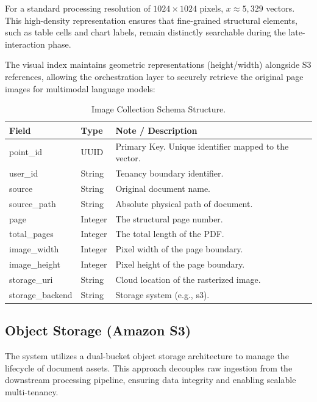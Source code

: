 For a standard processing resolution of $1024 \times 1024$ pixels, $x \approx 5,329$ vectors. This high-density representation ensures that fine-grained structural elements, such as table cells and chart labels, remain distinctly searchable during the late-interaction phase.

The visual index maintains geometric representations (height/width) alongside S3 references, allowing the orchestration layer to securely retrieve the original page images for multimodal language models:
\begin{table}[H]
    \centering
    \caption{Image Collection Schema Structure.}
    \label{tab:qdrant_image_schema}
    \begin{tabular}{llp{8cm}}
        \toprule
        \textbf{Field} & \textbf{Type} & \textbf{Note / Description} \\
        \midrule
        point\_id & UUID & Primary Key. Unique identifier mapped to the vector. \\
        \midrule
        user\_id & String & Tenancy boundary identifier. \\
        source & String & Original document name. \\
        source\_path & String & Absolute physical path of document. \\
        page & Integer & The structural page number. \\
        total\_pages & Integer & The total length of the PDF. \\
        image\_width & Integer & Pixel width of the page boundary. \\
        image\_height & Integer & Pixel height of the page boundary. \\
        storage\_uri & String & Cloud location of the rasterized image. \\
        storage\_backend & String & Storage system (e.g., s3). \\
        \bottomrule
    \end{tabular}
\end{table}

\subsection{Object Storage (Amazon S3)}
The system utilizes a dual-bucket object storage architecture to manage the lifecycle of document assets. This approach decouples raw ingestion from the downstream processing pipeline, ensuring data integrity and enabling scalable multi-tenancy.

